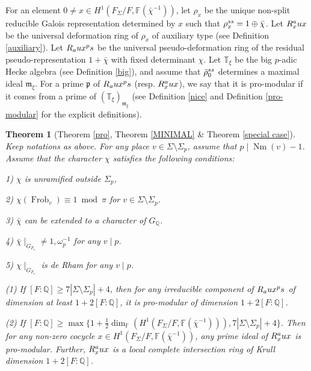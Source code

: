\documentclass[12pt]{amsart}
\theoremstyle{plain}
\newtheorem{thm}{Theorem}[subsection]
\theoremstyle{definition}
\theoremstyle{remark}
\begin{document}

For an element $0 \ne x \in H^1(F_{\Sigma}/F, \mathbb{F}(\bar{\chi}^{-1}))$, let $\rho_x$ be the unique non-split reducible Galois representation determined by $x$ such that $\rho_x^{\textnormal{ss}}=1 \oplus \bar{\chi}$. Let $R_x^\textnormal{aux}$ be the universal deformation ring of $\rho_x$ of auxiliary type (see Definition \ref{auxiliary}).
  Let $R_\textnormal{aux}^\textnormal{ps} $ be the universal pseudo-deformation ring of the residual pseudo-representation $1+\bar{\chi}$ with fixed determinant $\chi$. Let $\mathbb{T}_{\xi}$ be the big $p$-adic Hecke algebra (see Definition \ref{big}), and assume that $ \bar{\rho}_0^{\textnormal{ss}}$ determines a maximal ideal $\mathfrak{m}_{\xi}$. For a prime $\mathfrak{p}$ of $R_\textnormal{aux}^\textnormal{ps} $ (resp. $R_x^\textnormal{aux}$), we say that it is pro-modular if it comes from a prime of $(\mathbb{T}_{\xi})_{\mathfrak{m}_{\xi}}$ (see Definition \ref{nice} and Definition \ref{pro-modular} for the explicit definitions). 

\begin{thm} [Theorem \ref{pro}, Theorem \ref{MINIMAL} \& Theorem \ref{special case}] \label{main} Keep notations as above. For any place $v \in \Sigma \setminus \Sigma_p$, assume that $p \mid \operatorname{Nm}(v)-1$. Assume that the character $\chi$ satisfies the following conditions:
	
	1) $\chi$ is unramified outside $ \Sigma_p$,
	
	2) $\chi(\operatorname{Frob}_v) \equiv 1~\operatorname{mod}~\pi$ for  
	$v \in \Sigma \setminus \Sigma_p$.
	
	3) $\bar{\chi}$ can be extended to a character of $G_{\mathbb{Q}}$.
	
	4) $\bar{\chi} \mid_{G_{F_v}} \ne 1, \omega_p^{-1}$ for any $v \mid p$.
	
	5) $\chi \mid_{G_{F_v}}$ is de Rham for any $v \mid p$.
	
	(1) If $[F:\mathbb{Q}] \ge 7|\Sigma \setminus \Sigma_p|+4$, then for any irreducible component of $R_\textnormal{aux}^\textnormal{ps} $ of dimension at least $1+2[F:\mathbb{Q}]$, it is pro-modular of dimension $1+2[F:\mathbb{Q}]$.
	
   (2) If $[F:\mathbb{Q}] \ge \operatorname{max}\{1+\frac{1}{2}\operatorname{dim}_{\mathbb{F}}(H^1(F_{\Sigma}/F, \mathbb{F}(\bar{\chi}^{-1}))), 7|\Sigma \setminus \Sigma_p|+4\}$. Then for any non-zero cocycle $x \in H^1(F_{\Sigma}/F, \mathbb{F}(\bar{\chi}^{-1}))$, any prime ideal of $ R_x^\textnormal{aux}$ is pro-modular. Further, $R_x^\textnormal{aux}$ is a local complete intersection ring of Krull dimension $1+2[F:\mathbb{Q}]$.
\end{thm}
\end{document}
